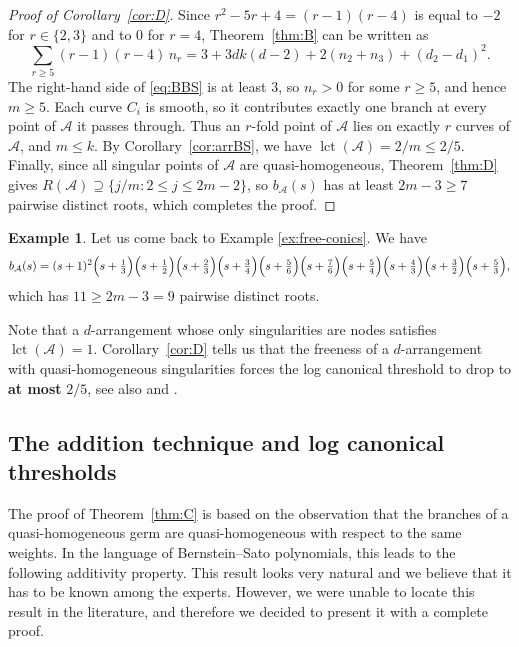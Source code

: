 \documentclass[11pt]{amsart}
\theoremstyle{definition}
\newtheorem{example}[theorem]{Example}
\numberwithin{equation}{section}
\newcommand{\cA}{\mathcal{A}}
\DeclareMathOperator{\lct}{lct}
\begin{document}
\begin{proof}[Proof of Corollary~\ref{cor:D}]
Since $r^2-5r+4=(r-1)(r-4)$ is equal to $-2$ for $r\in\{2,3\}$ and to $0$ for $r=4$, Theorem~\ref{thm:B} can be written as
\begin{equation}\label{eq:BBS}
\sum_{r\ge5}(r-1)(r-4)\,n_r=3+3dk(d-2)+2(n_2+n_3)+(d_2-d_1)^2 .
\end{equation}
The right-hand side of \eqref{eq:BBS} is at least $3$, so $n_r>0$ for some $r\ge5$, and hence $m\ge5$.
Each curve $C_i$ is smooth, so it contributes exactly one branch at every point of $\cA$ it passes through.
Thus an $r$-fold point of $\cA$ lies on exactly $r$ curves of $\cA$, and $m\le k$.
By Corollary~\ref{cor:arrBS}, we have $\lct(\cA)=2/m\le2/5$.
Finally, since all singular points of $\cA$ are quasi-homogeneous, Theorem~\ref{thm:D} gives $R(\cA)\supseteq\{j/m\colon2\le j\le2m-2\}$, so $b_\cA(s)$ has at least $2m-3\ge7$ pairwise distinct roots, which completes the proof.
\end{proof}
\begin{example}
Let us come back to Example \ref{ex:free-conics}. We have
\[
b_{\mathcal{A}}(s)=(s+1)^2\Bigl(s+\tfrac13\Bigr)\Bigl(s+\tfrac12\Bigr)\Bigl(s+\tfrac23\Bigr)
\Bigl(s+\tfrac34\Bigr)\Bigl(s+\tfrac56\Bigr)\Bigl(s+\tfrac76\Bigr)\Bigl(s+\tfrac54\Bigr)
\Bigl(s+\tfrac43\Bigr)\Bigl(s+\tfrac32\Bigr)\Bigl(s+\tfrac53\Bigr),
\]
which has $11\geq 2m-3=9$ pairwise distinct roots.
\end{example}
Note that a $d$-arrangement whose only singularities are nodes satisfies $\lct(\cA)=1$.
Corollary~\ref{cor:D} tells us that the freeness of a $d$-arrangement with quasi-homogeneous singularities forces the log canonical threshold to drop to \textbf{at most} $2/5$, see also \cite[Theorem 5.2]{Po24a} and \cite[Theorem A]{Po23}.

\subsection*{The addition technique and log canonical thresholds}
The proof of Theorem~\ref{thm:C} is based on the observation that the branches of a quasi-homogeneous germ are quasi-homogeneous with respect to the same weights.
In the language of Bernstein--Sato polynomials, this leads to the following additivity property. This result looks very natural and we believe that it has to be known among the experts. However, we were unable to locate this result in the literature, and therefore we decided to present it with a complete proof.
\end{document}

